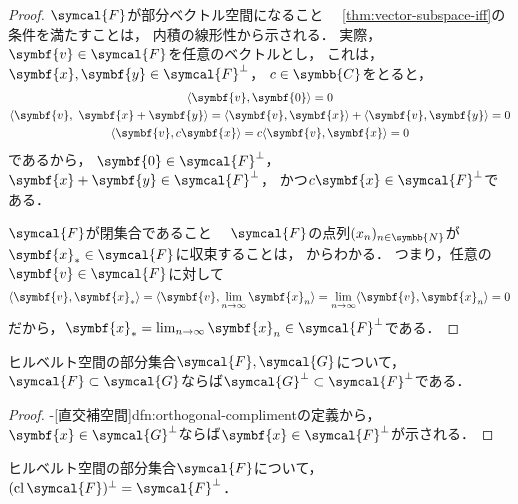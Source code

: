 \documentclass[../sotsu.tex]{subfiles}
\begin{document}
\begin{proof}
    \textsf{$\symcal{F}$が部分ベクトル空間になること}　%
    \cref{thm:vector-subspace-iff}の条件を満たすことは，
    内積の線形性から示される．
    実際，$\symbf{v} \in \symcal{F}$を任意のベクトルとし，
    これは，$\symbf{x}, \symbf{y} \in \symcal{F}^\perp$，
    $c \in \symbb{C}$をとると，
    \begin{gather*}
        \iparen{\symbf{v}, \symbf{0}} = 0
        \\
        \iparen{\symbf{v}, \  \symbf{x} + \symbf{y}}
        = \iparen{\symbf{v}, \symbf{x}} + \iparen{\symbf{v}, \symbf{y}}
        = 0
        \\
        \iparen{\symbf{v}, c \symbf{x}}
        = c \iparen{\symbf{v}, \symbf{x}}
        = 0
    \end{gather*}
    であるから，
    $\symbf{0} \in \symcal{F}^\perp$，
    $\symbf{x} + \symbf{y} \in \symcal{F}^\perp$，
    かつ$c \symbf{x} \in \symcal{F}^\perp$である．

    \textsf{$\symcal{F}$が閉集合であること}　%
    $\symcal{F}$の点列$\sequ{x_n}[n \in \symbb{N}]$が$\symbf{x}_* \in \symcal{F}$に収束することは，
    からわかる．
    つまり，任意の$\symbf{v} \in \symcal{F}$に対して
    \begin{equation*}
        \iparen{\symbf{v}, \symbf{x}_*}
        = \iparen{\symbf{v}, \lim_{n \to \infty} \symbf{x}_n}
        = \lim_{n \to \infty} \iparen{\symbf{v}, \symbf{x}_n}
        = 0
    \end{equation*}
    だから，$\symbf{x}_* = \lim_{n \to \infty} \symbf{x}_n \in \symcal{F}^\perp$である．
\end{proof}


\begin{lemma}
    \label{thm:Hilbert-subset-inclusion-orthogonal-compliment}
    ヒルベルト空間の部分集合$\symcal{F}, \symcal{G}$について，
    $\symcal{F} \subset \symcal{G}$ならば$\symcal{G}^\perp \subset \symcal{F}^\perp$である．
\end{lemma}

\begin{proof}
    -[直交補空間]{dfn:orthogonal-compliment}の定義から，
    $\symbf{x} \in \symcal{G}^\perp$ならば$\symbf{x} \in \symcal{F}^\perp$が示される．
\end{proof}


\begin{corollary}
    \label{thm:Hilbert-subset-orthogonal-complement-of-closure}
    ヒルベルト空間の部分集合$\symcal{F}$について，
    $(\closureop{\symcal{F}})^\perp = \symcal{F}^\perp$．
\end{corollary}
\end{document}
